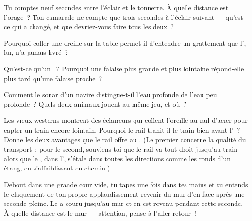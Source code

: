 \begin{exercise}[$\star$]\label{exo:g4:how-sound-travels:6}
Tu comptes neuf secondes entre l'éclair et le tonnerre. À quelle
distance est l'orage~? Ton camarade ne compte que trois secondes à
l'éclair suivant --- qu'est-ce qui a changé, et que devriez-vous
faire tous les deux~?
\end{exercise}

\begin{exercise}[$\star$]\label{exo:g4:how-sound-travels:7}
Pourquoi coller une oreille sur la table permet-il d'entendre un
grattement que l', lui, n'a jamais livré~?
\end{exercise}

\begin{exercise}[$\star$]\label{exo:g4:how-sound-travels:8}
Qu'est-ce qu'un ~? Pourquoi une falaise plus grande et plus
lointaine répond-elle plus tard qu'une falaise proche~?
\end{exercise}

\begin{exercise}[$\star$]\label{exo:g4:how-sound-travels:9}
Comment le sonar d'un navire distingue-t-il l'eau profonde de l'eau
peu profonde~? Quels deux animaux jouent au même jeu, et où~?
\end{exercise}

\begin{exercise}[$\star\star$]\label{exo:g4:how-sound-travels:10}
Les vieux westerns montrent des éclaireurs qui collent l'oreille au
rail d'acier pour capter un train encore lointain. Pourquoi le rail
trahit-il le train bien avant l'~? Donne les deux avantages que le
rail offre au . (Le premier concerne la qualité du transport~;
pour le second, souviens-toi que le rail va tout droit jusqu'au train
alors que le , dans l', s'étale dans toutes les directions
comme les ronds d'un étang, en s'affaiblissant en chemin.)
\end{exercise}

\begin{exercise}[$\star\star$]\label{exo:g4:how-sound-travels:11}
Debout dans une grande cour vide, tu tapes une fois dans tes mains et
tu entends le claquement de ton propre applaudissement revenir du mur
d'en face après une seconde pleine. Le  a couru jusqu'au mur et en
est revenu pendant cette seconde. À quelle distance est le mur ---
attention, pense à l'aller-retour~!
\end{exercise}
